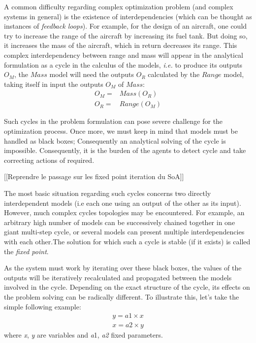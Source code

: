 A common difficulty regarding complex optimization problem (and complex systems in general) is the existence of interdependencies (which can be thought as instances of \emph{feedback loops}). For example, for the design of an aircraft, one could try to increase the range of the aircraft by increasing its fuel tank. But doing so, it increases the mass of the aircraft, which in return decreases its range. This complex interdependency between range and mass will appear in the analytical formulation as a cycle in the calculus of the models, \emph{i.e.} to produce its outputs $O_M$, the $Mass$ model will need the outputs $O_R$ calculated by the $Range$ model, taking itself in input the outputs $O_M$ of $Mass$:
\begin{align*}
O_M = &Mass(O_R)\\
O_R = &Range(O_M)
\end{align*}

Such cycles in the problem formulation can pose severe challenge for the optimization process. Once more, we must keep in mind that models must be handled as black boxes; Consequently an analytical solving of the cycle is impossible. Consequently, it is the burden of the agents to detect cycle and take correcting actions of required.

[[Reprendre le passage sur les fixed point iteration du SoA]]

The most basic situation regarding such cycles concerns two directly interdependent models (i.e each one using an output of the other as its input). However, much complex cycles topologies may be encountered. For example, an arbitrary high number of models can be successively chained together in one giant multi-step cycle, or several models can present multiple interdependencies with each other.The solution for which such a cycle is stable (if it exists) is called the \emph{fixed point}.

As the system must work by iterating over these black boxes, the values of the outputs will be iteratively recalculated and propagated between the models involved in the cycle. Depending on the exact structure of the cycle, its effects on the problem solving can be radically different. To illustrate this, let's take the simple following example:
\begin{gather*}
y = a1 \times x \\
x = a2 \times y
\end{gather*}
where \emph{x}, \emph{y} are variables and \emph{a}1, \emph{a2} fixed parameters.
 
